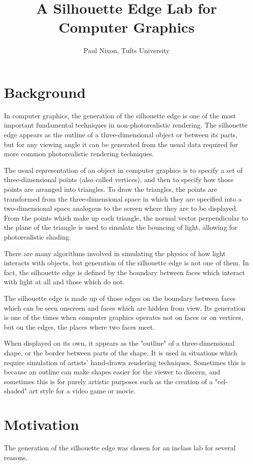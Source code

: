\documentclass[10pt,twocolumn]{article}
\title{\Large{\bf A Silhouette Edge Lab for Computer Graphics}}
\author{Paul Nixon, Tufts University}
\date{}
\begin{document}
\maketitle

\section{Background}
In computer graphics, the generation of the silhouette edge is one of the most important fundamental techniques in non-photorealistic rendering.  The silhouette edge appears as the outline of a three-dimensional object or between its parts, but for any viewing angle it can be generated from the usual data required for more common photorealistic rendering techniques.  

The usual representation of an object in computer graphics is to specify a set of three-dimensional points (also called vertices), and then to specify how those points are arranged into triangles.  To draw the triangles, the points are transformed from the three-dimensional space in which they are specified into a two-dimensional space analogous to the screen where they are to be displayed.  From the points which make up each triangle, the normal vector perpendicular to the plane of the triangle is used to simulate the bouncing of light, allowing for photorealistic shading.  

There are many algorithms involved in simulating the physics of how light interacts with objects, but generation of the silhouette edge is not one of them.  In fact, the silhouette edge is defined by the boundary between faces which interact with light at all and those which do not.  

The silhouette edge is made up of those edges on the boundary between faces which can be seen onscreen and faces which are hidden from view.  Its generation is one of the times when computer graphics operates not on faces or on vertices, but on the edges, the places where two faces meet.  

When displayed on its own, it appears as the "outline" of a three-dimensional shape, or the border between parts of the shape.  It is used in situations which require simulation of artists' hand-drawn rendering techniques.  Sometimes this is because an outline can make shapes easier for the viewer to discern, and sometimes this is for purely artistic purposes such as the creation of a "cel-shaded" art style for a video game or movie.  

\section{Motivation}
The generation of the silhouette edge was chosen for an inclass lab for several reasons.  
\end{document}
